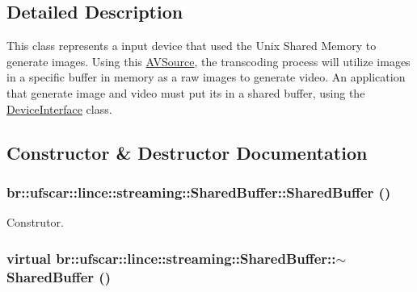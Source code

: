 \subsection{Detailed Description}
This class represents a input device that used the Unix Shared Memory to generate images. Using this \hyperlink{classbr_1_1ufscar_1_1lince_1_1streaming_1_1AVSource}{AVSource}, the transcoding process will utilize images in a specific buffer in memory as a raw images to generate video. An application that generate image and video must put its in a shared buffer, using the \hyperlink{classbr_1_1ufscar_1_1lince_1_1streaming_1_1DeviceInterface}{DeviceInterface} class. 

\subsection{Constructor \& Destructor Documentation}
\hypertarget{classbr_1_1ufscar_1_1lince_1_1streaming_1_1SharedBuffer_af2437fb2e8b6838c91bf56a8f4b2fd8f}{
\subsubsection[{SharedBuffer}]{\setlength{\rightskip}{0pt plus 5cm}br::ufscar::lince::streaming::SharedBuffer::SharedBuffer ()}}
\label{classbr_1_1ufscar_1_1lince_1_1streaming_1_1SharedBuffer_af2437fb2e8b6838c91bf56a8f4b2fd8f}


Construtor. 

\hypertarget{classbr_1_1ufscar_1_1lince_1_1streaming_1_1SharedBuffer_a9389b51eb706e3a9431645784415b684}{
\subsubsection[{$\sim$SharedBuffer}]{\setlength{\rightskip}{0pt plus 5cm}virtual br::ufscar::lince::streaming::SharedBuffer::$\sim$SharedBuffer ()}}
\label{classbr_1_1ufscar_1_1lince_1_1streaming_1_1SharedBuffer_a9389b51eb706e3a9431645784415b684}


